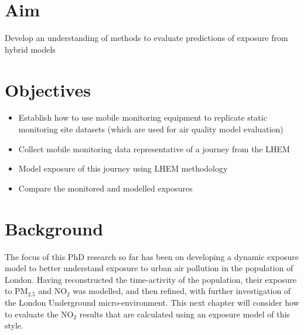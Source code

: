 \section{Aim}
\label{sec:4aim}

Develop an understanding of methods to evaluate predictions of exposure from hybrid models

\section{Objectives}
\label{sec:4objectives}

\begin{itemize}
    \item Establish how to use mobile monitoring equipment to replicate static monitoring site datasets (which are used for air quality model evaluation)
    \item Collect mobile monitoring data representative of a journey from the LHEM
    \item Model exposure of this journey using LHEM methodology
    \item Compare the monitored and modelled exposures
\end{itemize}

\section{Background}
\label{sec:4background}

The focus of this PhD research so far has been on developing a dynamic exposure model to better understand exposure to urban air pollution in the population of London. Having reconstructed the time-activity of the population, their exposure to PM$_{2.5}$ and NO$_{2}$ was modelled, and then refined, with further investigation of the London Underground micro-environment. This next chapter will consider how to evaluate the NO$_{2}$ results that are calculated using an exposure model of this style.

